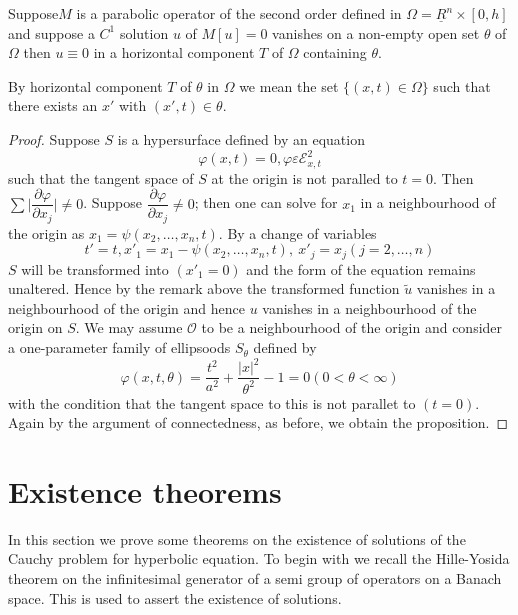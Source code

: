 \begin{proposition}\label{chap3-sec7-prop3}%
Suppose\pageoriginale $M$ is a parabolic operator of the second order
defined in 
$\Omega = \underline{R}^n \times [0, h]$ and suppose a $C^1$ solution $u$ of
$M[ u ] = 0$ vanishes on a non-empty open set $\theta$ of $\Omega$
then $u \equiv 0$ in a horizontal component $T$ of $\Omega$ containing
$\theta$. 
 
By horizontal component $T$ of $\theta$ in $\Omega$ we mean the set
$\{ (x, t) \in \Omega \}$ such that there exists an $x'$ with $(x',
t) \in \theta$. 
\end{proposition}

\begin{proof}
Suppose $S$ is a hypersurface defined by an equation
$$
\varphi(x,t) = 0, \varphi \varepsilon \mathscr{E}^2_{x, t} 
$$
such that the tangent space of $S$ at the origin is not paralled to $t
= 0$. Then $\sum |\dfrac{\partial \varphi} {\partial x_j} \big| \neq
0$. Suppose $\dfrac{\partial \varphi}{\partial x_j} \neq 0$; then one
can solve for $x_1$ in a neighbourhood of the origin as $x_1 = \psi
(x_2, \ldots, x_n, t)$. By a change of variables  
$$
t' = t, x'_1 = x_1 - \psi (x_2, \ldots, x_n, t),\ x'_j = x_j( j = 2, 
\ldots, n) 
$$
$S$ will be transformed into $(x'_1 = 0)$ and the form of the equation
remains unaltered. Hence by the remark above the transformed function
$\tilde{u}$ vanishes in a neighbourhood of the origin and hence $u$
vanishes in a neighbourhood of the origin on $S$. We may assume
$\mathscr{O}$ to be a neighbourhood of the origin and consider a
one-parameter family of ellipsoods $S_{\theta}$ defined by  
$$
\varphi (x, t, \theta) = \frac{t^2}{a^2} + \frac{|x|^2}{\theta^2} -1 =
0 (0 < \theta < \infty) 
$$
with the condition that the tangent space to this is not parallet to
$(t = 0)$. Again by the argument of connectedness, as before, we
obtain the proposition. 
\end{proof}

\section{Existence theorems}\pageoriginale\label{chap3-sec8}%

In this section we prove some theorems on the existence
of solutions of the Cauchy problem for hyperbolic equation. To begin
with we recall the Hille-Yosida theorem on the infinitesimal generator
of a semi group of operators on a Banach space. This is used to assert
the existence of solutions.  

